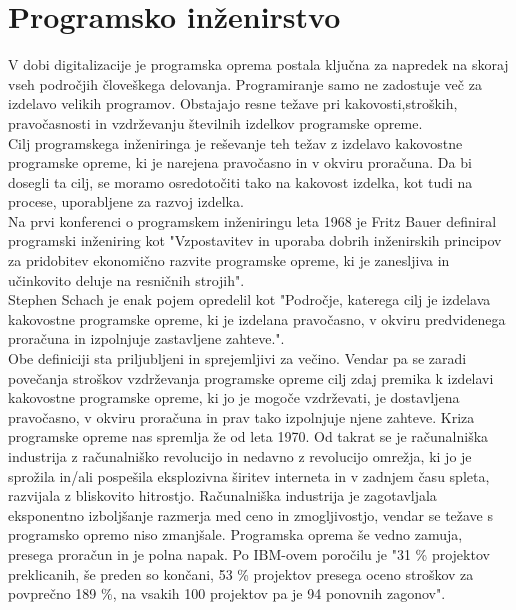 \documentclass[a4paper,12pt,openright]{book}
\begin{document}
\section{Programsko inženirstvo}
V dobi digitalizacije je programska oprema postala ključna za napredek na skoraj vseh področjih človeškega delovanja. Programiranje samo ne zadostuje več za izdelavo velikih programov. Obstajajo resne težave pri kakovosti,stroških, pravočasnosti in vzdrževanju številnih izdelkov programske opreme.\\
Cilj programskega inženiringa je reševanje teh težav z izdelavo kakovostne programske opreme, ki je narejena pravočasno in v okviru proračuna. Da bi dosegli ta cilj, se moramo osredotočiti tako na kakovost izdelka, kot tudi na procese, uporabljene za razvoj izdelka.\\
Na prvi konferenci o programskem inženiringu leta 1968 je Fritz Bauer definiral programski inženiring kot "Vzpostavitev in uporaba dobrih inženirskih principov za pridobitev ekonomično razvite programske opreme, ki je zanesljiva in učinkovito deluje na resničnih strojih". \\
Stephen Schach je enak pojem opredelil kot "Področje, katerega cilj je izdelava kakovostne programske opreme, ki je izdelana pravočasno, v okviru predvidenega proračuna in izpolnjuje zastavljene zahteve.".\cite{randell19961968} \\ Obe definiciji sta priljubljeni in sprejemljivi za večino. Vendar pa se zaradi povečanja stroškov vzdrževanja programske opreme cilj zdaj premika k izdelavi kakovostne programske opreme, ki jo je mogoče vzdrževati, je dostavljena pravočasno, v okviru proračuna in prav tako izpolnjuje njene zahteve.
Kriza programske opreme nas spremlja že od leta 1970. Od takrat se je računalniška industrija z računalniško revolucijo in nedavno z revolucijo omrežja, ki jo je sprožila in/ali pospešila eksplozivna širitev interneta in v zadnjem času spleta, razvijala z bliskovito hitrostjo.
Računalniška industrija je zagotavljala eksponentno izboljšanje razmerja med ceno in zmogljivostjo, vendar se težave s programsko opremo niso zmanjšale. Programska oprema še vedno zamuja, presega proračun in je polna napak. Po IBM-ovem poročilu je "31 \% projektov preklicanih, še preden so končani, 53 \% projektov presega oceno stroškov za povprečno 189 \%, na vsakih 100 projektov pa je 94 ponovnih zagonov". \cite{boehm2006view}
\end{document}
